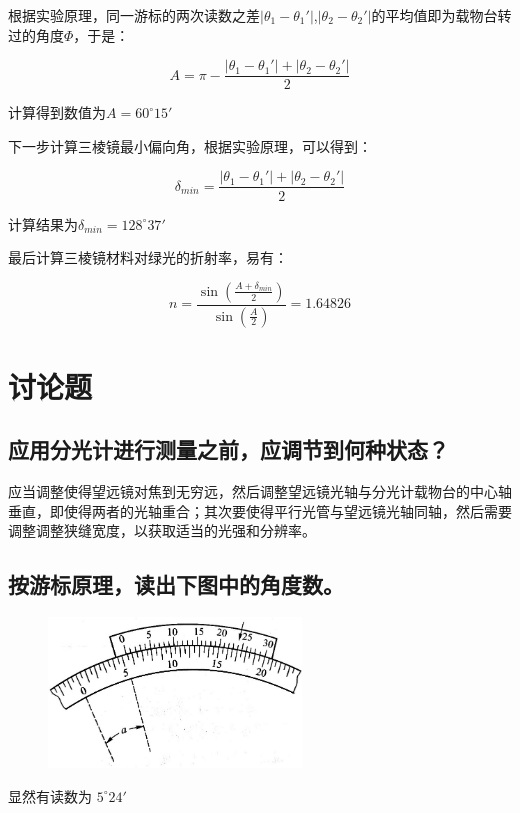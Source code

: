 \documentclass{ctexart}
\begin{document}
根据实验原理，同一游标的两次读数之差$ \left|\theta_1 - \theta_1'\right| $,$ \left|\theta_2 - \theta_2'\right| $的平均值即为载物台转过的角度$\varPhi $，于是：

$$ A = \pi - \frac{\left|\theta_1 - \theta_1'\right|+\left|\theta_2 - \theta_2'\right|}{2} $$

计算得到数值为$ A = 60^\circ 15' $

下一步计算三棱镜最小偏向角，根据实验原理，可以得到：

$$ \delta_{min} = \frac{\left|\theta_1 - \theta_1'\right|+\left|\theta_2 - \theta_2'\right|}{2} $$

计算结果为$ \delta_{min} = 128^\circ 37' $

最后计算三棱镜材料对绿光的折射率，易有：

$$ n = \frac{\sin\left(\frac{A+\delta_{min}}{2}\right)}{\sin\left(\frac{A}{2}\right)} = 1.64826 $$

\newpage

\section{讨论题}

\subsection{应用分光计进行测量之前，应调节到何种状态？}

应当调整使得望远镜对焦到无穷远，然后调整望远镜光轴与分光计载物台的中心轴垂直，即使得两者的光轴重合；其次要使得平行光管与望远镜光轴同轴，然后需要调整调整狭缝宽度，以获取适当的光强和分辨率。

\subsection{按游标原理，读出下图中的角度数。}

\begin{figure}[!ht]
    \centering
    \includegraphics[width=0.6\textwidth]{./1.jpg}
\end{figure}

显然有读数为 $ 5^\circ 24' $
\end{document}
